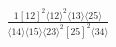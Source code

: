 \documentclass[varwidth, border=5pt]{standalone}
\begin{document}
\begin{my}
$\begin{gathered}
\scriptscriptstyle\frac{1[12]^2⟨12⟩^2⟨13⟩⟨25⟩}{⟨14⟩⟨15⟩⟨23⟩^2[25]^2⟨34⟩}
\end{gathered}$
\end{my}
\end{document}

